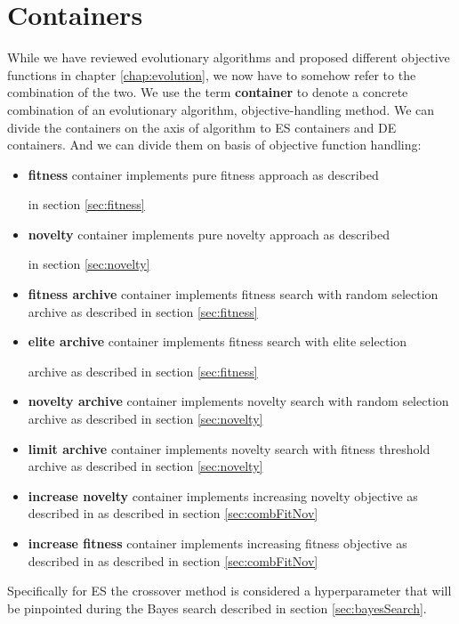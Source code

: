 \section{Containers}
While we have reviewed evolutionary algorithms and proposed different objective functions in chapter \ref{chap:evolution}, we now have to somehow refer to the combination of the two. We use the term \textbf{container} to denote a concrete combination of an evolutionary algorithm, objective-handling method.
We can divide the containers on the axis of algorithm to ES containers and DE containers. And we can divide them on basis of objective function handling:
\begin{itemize}
	\item \textbf{fitness} container implements pure fitness approach as described 
	
	in section \ref{sec:fitness}
	
	\item \textbf{novelty} container implements pure novelty approach as described 
	
	in section \ref{sec:novelty}
	
	\item \textbf{fitness archive} container implements fitness search with random selection archive as described in section  \ref{sec:fitness}
	
	\item \textbf{elite archive} container implements fitness search with elite selection
	
	archive as described in section \ref{sec:fitness}
	
	
	\item \textbf{novelty archive} container implements novelty search with random selection archive as described in section \ref{sec:novelty}
	\item \textbf{limit archive} container implements novelty search with fitness threshold archive as described in section \ref{sec:novelty}
	\item \textbf{increase novelty} container implements increasing novelty objective as described in as described in section \ref{sec:combFitNov}
	\item \textbf{increase fitness} container implements increasing fitness objective as described in as described in section \ref{sec:combFitNov}
	
\end{itemize}
Specifically for ES the crossover method is considered a hyperparameter that will be pinpointed during the Bayes search described in section \ref{sec:bayesSearch}.
